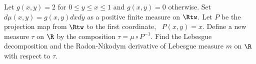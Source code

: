 Let $g(x,y)=2$ for $0\leq y\leq x\leq 1$ and $g(x,y)=0$ otherwise. Set
$d\mu(x,y)=g(x,y)dxdy$ as a positive finite measure on $\Rtw$. Let $P$
be the projection map from $\Rtw$ to the first coordinate, \ie\
$P(x,y)=x$. Define a new measure $\tau$ on $\R$ by the composition
$\tau=\mu\circ P^{-1}$. Find the Lebesgue decomposition and the
Radon-Nikodym derivative of Lebesgue measure $m$ on $\R$ with respect
to $\tau$.
